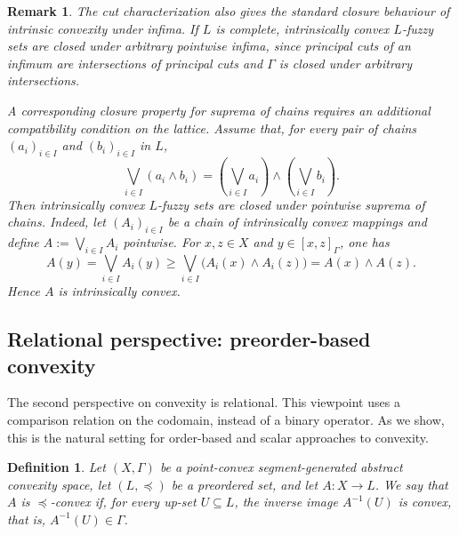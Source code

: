 \documentclass[11pt,a4paper]{article}
\newtheorem{remark}{Remark}
\newtheorem{definition}{Definition}
\begin{document}
\begin{remark}\label{rem:closure-intrinsic}
The cut characterization also gives the standard closure behaviour of intrinsic convexity under infima. If \(L\) is complete, intrinsically convex \(L\)-fuzzy sets are closed under arbitrary pointwise infima, since principal cuts of an infimum are intersections of principal cuts and \(\Gamma\) is closed under arbitrary intersections.

A corresponding closure property for suprema of chains requires an additional compatibility condition on the lattice. Assume that, for every pair of chains \((a_i)_{i\in I}\) and \((b_i)_{i\in I}\) in \(L\),
\begin{equation*}
\bigvee_{i\in I}(a_i\wedge b_i)=
\left(\bigvee_{i\in I}a_i\right)\wedge
\left(\bigvee_{i\in I}b_i\right).
\end{equation*}
Then intrinsically convex \(L\)-fuzzy sets are closed under pointwise suprema of chains. Indeed, let \((A_i)_{i\in I}\) be a chain of intrinsically convex mappings and define \(A:=\bigvee_{i\in I}A_i\) pointwise. For \(x,z\in X\) and \(y\in[x,z]_{\Gamma}\), one has
\begin{equation*}
A(y)
=
\bigvee_{i\in I}A_i(y)
\geq
\bigvee_{i\in I}\bigl(A_i(x)\wedge A_i(z)\bigr)
=
A(x)\wedge A(z).
\end{equation*}
Hence \(A\) is intrinsically convex.
\end{remark}










\subsection{Relational perspective: preorder-based convexity}

\smallskip

The second perspective on convexity is relational. This viewpoint uses a comparison relation on the codomain, instead of a binary operator. As we show, this is the natural setting for order-based and scalar approaches to convexity. %

\begin{definition}\label{def_order_convex}
Let \((X,\Gamma)\) be a point-convex segment-generated abstract convexity space, let \((L,\preccurlyeq)\) be a preordered set, and let \(A:X\to L\). We say that \(A\) is \emph{\(\preccurlyeq\)-convex} if, for every up-set \(U\subseteq L\), the inverse image \(A^{-1}(U)\) is convex, that is, \(A^{-1}(U)\in\Gamma\).
\end{definition}
\end{document}
